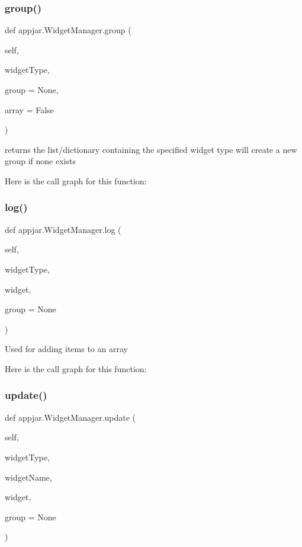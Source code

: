 \subsubsection{\texorpdfstring{group()}{group()}}
{\footnotesize\ttfamily def appjar.\+Widget\+Manager.\+group (\begin{DoxyParamCaption}\item[{}]{self,  }\item[{}]{widget\+Type,  }\item[{}]{group = {\ttfamily None},  }\item[{}]{array = {\ttfamily False} }\end{DoxyParamCaption})}

\begin{DoxyVerb}returns the list/dictionary containing the specified widget type
will create a new group if none exists
\end{DoxyVerb}
 Here is the call graph for this function\+:
\mbox{\label{classappjar_1_1_widget_manager_a24c5c2b761f77a0a379e6607315f48b4}} 
\subsubsection{\texorpdfstring{log()}{log()}}
{\footnotesize\ttfamily def appjar.\+Widget\+Manager.\+log (\begin{DoxyParamCaption}\item[{}]{self,  }\item[{}]{widget\+Type,  }\item[{}]{widget,  }\item[{}]{group = {\ttfamily None} }\end{DoxyParamCaption})}

\begin{DoxyVerb}Used for adding items to an array \end{DoxyVerb}
 Here is the call graph for this function\+:
\mbox{\label{classappjar_1_1_widget_manager_adcb0832cb43e8322c7510daf805cb825}} 
\subsubsection{\texorpdfstring{update()}{update()}}
{\footnotesize\ttfamily def appjar.\+Widget\+Manager.\+update (\begin{DoxyParamCaption}\item[{}]{self,  }\item[{}]{widget\+Type,  }\item[{}]{widget\+Name,  }\item[{}]{widget,  }\item[{}]{group = {\ttfamily None} }\end{DoxyParamCaption})}


